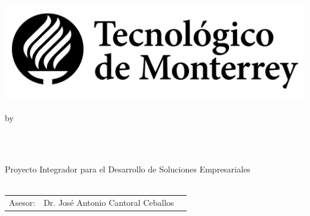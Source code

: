 \documentclass[11pt, a4paper, oneside]{Thesis}
\title{\ttitle}
\begin{document}
\frontmatter
{}

\fancyhead{}
\rhead{\thepage}
\lhead{}

\pagestyle{fancy}
\newcommand{\HRule}{\rule{\linewidth}{0.5mm}}

\hypersetup{pdfsubject=\subjectname}
\hypersetup{pdfkeywords=\keywordnames}


\begin{titlepage}
\begin{center}

\textsc{\Large \univname}\\
\textsc{\Large \facname}\\
\textsc{\Large \schoolname}\\[1cm]
\includegraphics[scale=.3]{img/logo.png} \\
\\[0.5cm]

\large by\\[0.5cm]

\begin{minipage}{0.4\textwidth}
\begin{center} \large
{}
\large{\href{mailto:albertcastaned@gmail.com?subject=Gaze-Tracking Thesis}{\authornames}} 
\\[0.5cm] 
\end{center}
\end{minipage}\\[0.5cm]

\large Proyecto Integrador para el Desarrollo de Soluciones Empresariales \\ \textit{\degreename}\\[0.8cm]

\begin{table}[!h]
\begin{center}
\begin{tabular}{lll}
\multicolumn{1}{r}{Asesor:} & Dr. José Antonio Cantoral Ceballos \\
\end{tabular}
\end{center}
\end{table}


\end{center}
\end{titlepage}
\end{document}
